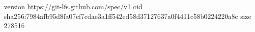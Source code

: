 version https://git-lfs.github.com/spec/v1
oid sha256:7984afb95d8fa07cf7cdae3a1ff542ed58d37127637a0f4411c58b0224220a8c
size 278516
